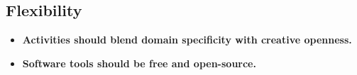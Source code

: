 \documentclass{sigchi}
\begin{document}
\subsection{Flexibility}
\begin{itemize}
\item \textbf{Activities should blend domain specificity with creative openness.} %

\item \textbf{ Software tools should be free and open-source.} %
\end{itemize}
\end{document}
